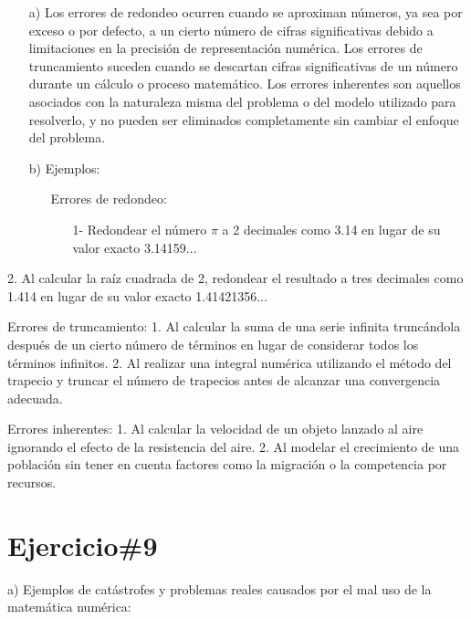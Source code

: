 \documentclass[a4paper,12pt]{article}
\begin{document}
\begin{itemize}
    \item[a)]Los errores de redondeo ocurren cuando se aproximan números, ya sea por exceso o por defecto, a un cierto número de cifras significativas debido a 
limitaciones en la precisión de representación numérica. Los errores de truncamiento suceden cuando se descartan cifras significativas de un número 
durante un cálculo o proceso matemático. Los errores inherentes son aquellos asociados con la naturaleza misma del problema o del modelo utilizado para 
resolverlo, y no pueden ser eliminados completamente sin cambiar el enfoque del problema. 
    \item[b)]Ejemplos:
    \item[]\begin{itemize}
        \item[Errores de redondeo:]
            \begin{itemize}
                \item[1-]Redondear el número $\pi$ a 2 decimales como 3.14 en lugar de su valor exacto 3.14159...
            \end{itemize}   
    \end{itemize}
    


\end{itemize}
 

 


2. Al calcular la raíz cuadrada de 2, redondear el resultado a tres decimales como 1.414 en lugar de su valor exacto 1.41421356...

Errores de truncamiento:
1. Al calcular la suma de una serie infinita truncándola después de un cierto número de términos en lugar de considerar todos los términos infinitos.
2. Al realizar una integral numérica utilizando el método del trapecio y truncar el número de trapecios antes de alcanzar una convergencia adecuada.

Errores inherentes:
1. Al calcular la velocidad de un objeto lanzado al aire ignorando el efecto de la resistencia del aire.
2. Al modelar el crecimiento de una población sin tener en cuenta factores como la migración o la competencia por recursos.


\section*{Ejercicio\#9}

a) Ejemplos de catástrofes y problemas reales causados por el mal uso de la matemática numérica:
\end{document}

